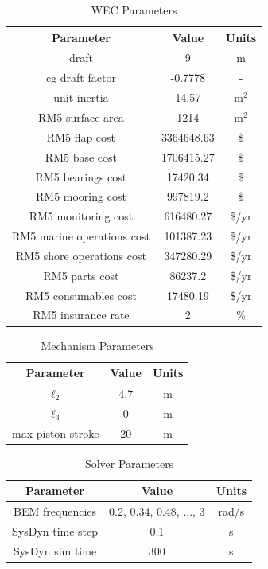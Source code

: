 \documentclass[twocolumn,10pt]{asme2e}
\begin{document}
\begin{table}[h]
    \centering
    \caption{WEC Parameters}
    \begin{tabular}{|c|c|c|}
        \hline
        \textbf{Parameter} & \textbf{Value} & \textbf{Units} \\
        \hline
        draft & 9 & m \\
        cg draft factor & -0.7778 & - \\
        unit inertia & 14.57 & m$^2$ \\
        RM5 surface area & 1214 & m$^2$ \\
        RM5 flap cost & 3364648.63 & \$ \\
        RM5 base cost & 1706415.27 & \$ \\
        RM5 bearings cost & 17420.34 & \$ \\
        RM5 mooring cost & 997819.2 & \$ \\
        RM5 monitoring cost & 616480.27 & \$/yr \\
        RM5 marine operations cost & 101387.23 & \$/yr \\
        RM5 shore operations cost & 347280.29 & \$/yr \\
        RM5 parts cost & 86237.2 & \$/yr \\
        RM5 consumables cost & 17480.19 & \$/yr \\
        RM5 insurance rate & 2 & \% \\
        \hline
    \end{tabular}
    \label{tab:paramswec}
\end{table}

\begin{table}[h]
    \centering
    \caption{Mechanism Parameters}
    \begin{tabular}{|c|c|c|}
        \hline
        \textbf{Parameter} & \textbf{Value} & \textbf{Units} \\
        \hline
        $\ell_2$ & 4.7 & m \\
        $\ell_3$ & 0 & m \\
        max piston stroke & 20 & m \\
        \hline
    \end{tabular}
    \label{tab:paramsmech}
\end{table}

\begin{table}[h]
    \centering
    \caption{Solver Parameters}
    \begin{tabular}{|c|c|c|}
        \hline
        \textbf{Parameter} & \textbf{Value} & \textbf{Units} \\
        \hline
        BEM frequencies & 0.2, 0.34, 0.48, ..., 3& rad/s \\
        SysDyn time step & 0.1 & s \\
        SysDyn sim time & 300 & s \\
        \hline
    \end{tabular}
    \label{tab:paramssolve}
\end{table}
\end{document}

